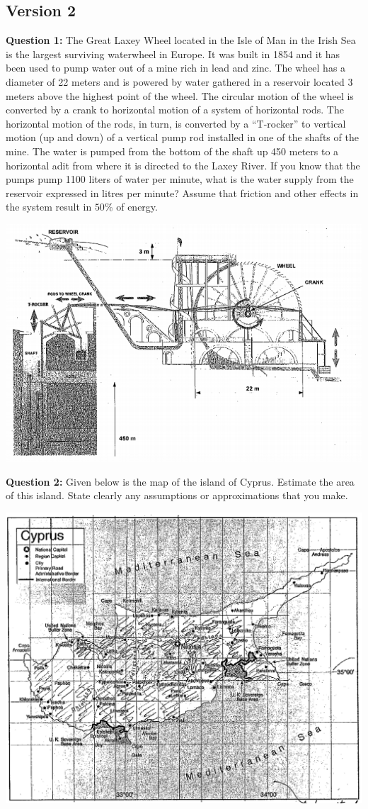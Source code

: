 \documentclass{article}
\begin{document}
\subsection*{Version 2}
\textbf{Question 1:} The Great Laxey Wheel located in the Isle of Man in the Irish Sea is the largest surviving waterwheel in Europe. It was built in 1854 and it has been used to pump water out of a mine rich in lead and zinc. The wheel has a diameter of 22 meters and is powered by water gathered in a reservoir located 3 meters above the highest point of the wheel. The circular motion of the wheel is converted by a crank to horizontal motion of a system of horizontal rods. The horizontal motion of the rods, in turn, is converted by a ``T-rocker'' to vertical motion (up and down) of a vertical pump rod installed in one of the shafts of the mine. The water is pumped from the bottom of the shaft up 450 meters to a horizontal adit from where it is directed to the Laxey River. If you know that the pumps pump 1100 liters of water per minute, what is the water supply from the reservoir expressed in litres per minute? Assume that friction and other effects in the system result in $50\%$ of energy.
\begin{center}
    \includegraphics[width=0.8\linewidth]{2009-2-1.png}
\end{center}

\newpage
\textbf{Question 2:} Given below is the map of the island of Cyprus. Estimate the area of this island. State clearly any assumptions or approximations that you make.
\begin{center}
    \includegraphics[width=0.8\linewidth]{2009-2-2.png}
\end{center}
\end{document}
